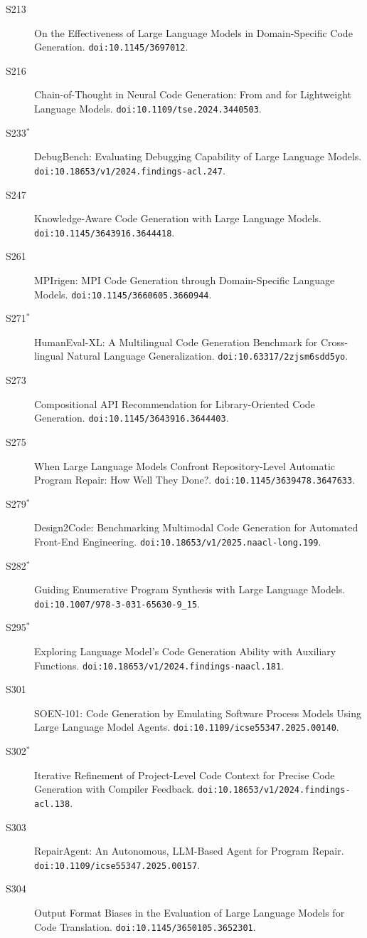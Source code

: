 {\begin{description}
\item[S213] On the Effectiveness of Large Language Models in Domain-Specific Code Generation. \texttt{doi:10.1145/3697012}.
\item[S216] Chain-of-Thought in Neural Code Generation: From and for Lightweight Language Models. \texttt{doi:10.1109/tse.2024.3440503}.
\item[S233$^\ast$] DebugBench: Evaluating Debugging Capability of Large Language Models. \texttt{doi:10.18653/v1/2024.findings-acl.247}.
\item[S247] Knowledge-Aware Code Generation with Large Language Models. \texttt{doi:10.1145/3643916.3644418}.
\item[S261] MPIrigen: MPI Code Generation through Domain-Specific Language Models. \texttt{doi:10.1145/3660605.3660944}.
\item[S271$^\ast$] HumanEval-XL: A Multilingual Code Generation Benchmark for Cross-lingual Natural Language Generalization. \texttt{doi:10.63317/2zjsm6sdd5yo}.
\item[S273] Compositional API Recommendation for Library-Oriented Code Generation. \texttt{doi:10.1145/3643916.3644403}.
\item[S275] When Large Language Models Confront Repository-Level Automatic Program Repair: How Well They Done?. \texttt{doi:10.1145/3639478.3647633}.
\item[S279$^\ast$] Design2Code: Benchmarking Multimodal Code Generation for Automated Front-End Engineering. \texttt{doi:10.18653/v1/2025.naacl-long.199}.
\item[S282$^\ast$] Guiding Enumerative Program Synthesis with Large Language Models. \texttt{doi:10.1007/978-3-031-65630-9\_15}.
\item[S295$^\ast$] Exploring Language Model's Code Generation Ability with Auxiliary Functions. \texttt{doi:10.18653/v1/2024.findings-naacl.181}.
\item[S301] SOEN-101: Code Generation by Emulating Software Process Models Using Large Language Model Agents. \texttt{doi:10.1109/icse55347.2025.00140}.
\item[S302$^\ast$] Iterative Refinement of Project-Level Code Context for Precise Code Generation with Compiler Feedback. \texttt{doi:10.18653/v1/2024.findings-acl.138}.
\item[S303] RepairAgent: An Autonomous, LLM-Based Agent for Program Repair. \texttt{doi:10.1109/icse55347.2025.00157}.
\item[S304] Output Format Biases in the Evaluation of Large Language Models for Code Translation. \texttt{doi:10.1145/3650105.3652301}.

\end{description}}

